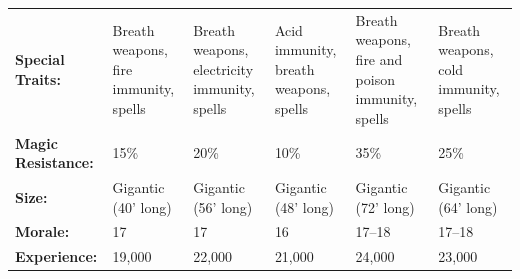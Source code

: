\begin{minipage}{\columnwidth}
\begin{tabular}{p{}g{.13\columnwidth}p{.14\columnwidth}g{.14\columnwidth}p{.13\columnwidth}g{.13\columnwidth}}
\textbf{Special Traits:} 	& Breath weapons, fire immunity, spells	& Breath weapons, electricity immunity, spells	& Acid immunity, breath weapons, spells	& Breath weapons, fire and poison immunity, spells	& Breath weapons, cold immunity, spells	\\
\textbf{Magic Resistance:} 	& 15\%		& 20\%		& 10\%		& 35\%		& 25\%		\\
\textbf{Size:} 				& Gigantic (40' long)		& Gigantic (56' long)		& Gigantic (48' long)		& Gigantic (72' long)		& Gigantic (64' long)		\\ %
\textbf{Morale:} 			& 17		& 17		& 16		& 17--18		& 17--18		\\
\textbf{Experience:} 		& 19,000		& 22,000		& 21,000		& 24,000		& 23,000		\\
\end{tabular}

\end{minipage}

